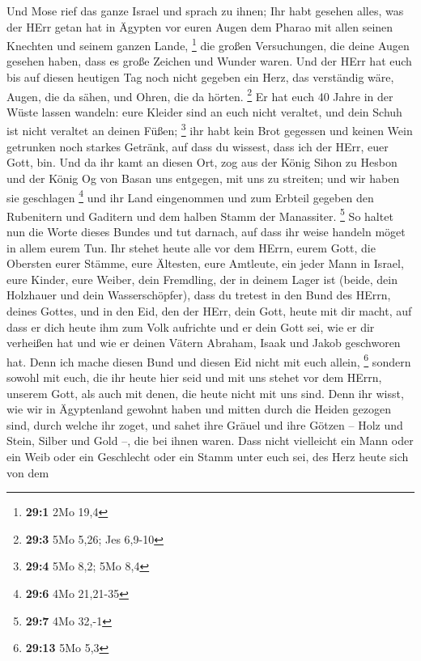  Und Mose rief das ganze Israel und sprach zu ihnen; Ihr
habt gesehen alles, was der HErr getan hat in Ägypten vor euren Augen
dem Pharao mit allen seinen Knechten und seinem ganzen Lande,
\footnote{\textbf{29:1} 2Mo 19,4}  die großen
Versuchungen, die deine Augen gesehen haben, dass es große Zeichen und
Wunder waren.  Und der HErr hat euch bis auf diesen
heutigen Tag noch nicht gegeben ein Herz, das verständig wäre, Augen,
die da sähen, und Ohren, die da hörten. \footnote{\textbf{29:3} 5Mo
  5,26; Jes 6,9-10}  Er hat euch 40 Jahre in der Wüste
lassen wandeln: eure Kleider sind an euch nicht veraltet, und dein Schuh
ist nicht veraltet an deinen Füßen; \footnote{\textbf{29:4} 5Mo 8,2; 5Mo
  8,4}  ihr habt kein Brot gegessen und keinen Wein
getrunken noch starkes Getränk, auf dass du wissest, dass ich der HErr,
euer Gott, bin.  Und da ihr kamt an diesen Ort, zog aus
der König Sihon zu Hesbon und der König Og von Basan uns entgegen, mit
uns zu streiten; und wir haben sie geschlagen \footnote{\textbf{29:6}
  4Mo 21,21-35}  und ihr Land eingenommen und zum Erbteil
gegeben den Rubenitern und Gaditern und dem halben Stamm der Manassiter.
\footnote{\textbf{29:7} 4Mo 32,-1}  So haltet nun die
Worte dieses Bundes und tut darnach, auf dass ihr weise handeln möget in
allem eurem Tun.  Ihr stehet heute alle vor dem HErrn,
eurem Gott, die Obersten eurer Stämme, eure Ältesten, eure Amtleute, ein
jeder Mann in Israel,  eure Kinder, eure Weiber, dein
Fremdling, der in deinem Lager ist (beide, dein Holzhauer und dein
Wasserschöpfer),  dass du tretest in den Bund des HErrn,
deines Gottes, und in den Eid, den der HErr, dein Gott, heute mit dir
macht,  auf dass er dich heute ihm zum Volk aufrichte und
er dein Gott sei, wie er dir verheißen hat und wie er deinen Vätern
Abraham, Isaak und Jakob geschworen hat.  Denn ich mache
diesen Bund und diesen Eid nicht mit euch allein, \footnote{\textbf{29:13}
  5Mo 5,3}  sondern sowohl mit euch, die ihr heute hier
seid und mit uns stehet vor dem HErrn, unserem Gott, als auch mit denen,
die heute nicht mit uns sind.  Denn ihr wisst, wie wir in
Ägyptenland gewohnt haben und mitten durch die Heiden gezogen sind,
durch welche ihr zoget,  und sahet ihre Gräuel und ihre
Götzen -- Holz und Stein, Silber und Gold --, die bei ihnen waren.
 Dass nicht vielleicht ein Mann oder ein Weib oder ein
Geschlecht oder ein Stamm unter euch sei, des Herz heute sich von dem
